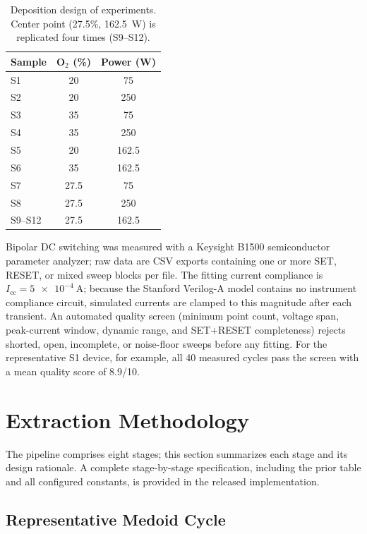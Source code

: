 \documentclass[journal]{IEEEtran}
\begin{document}
\begin{table}[!t]
\centering
\caption{Deposition design of experiments. Center point (27.5\%,
\SI{162.5}{\watt}) is replicated four times (S9--S12).}
\label{tab:doe}
\footnotesize
\begin{tabular}{@{}lcc@{}}
\toprule
Sample & O$_2$ (\%) & Power (W)\\
\midrule
S1 & 20   & 75\\
S2 & 20   & 250\\
S3 & 35   & 75\\
S4 & 35   & 250\\
S5 & 20   & 162.5\\
S6 & 35   & 162.5\\
S7 & 27.5 & 75\\
S8 & 27.5 & 250\\
S9--S12 & 27.5 & 162.5\\
\bottomrule
\end{tabular}
\end{table}

Bipolar DC switching was measured with a Keysight B1500 semiconductor
parameter analyzer; raw data are CSV exports containing one or more SET,
RESET, or mixed sweep blocks per file.  The fitting current compliance is
$I_{\mathrm{cc}}=\SI{5e-4}{\ampere}$; because the Stanford Verilog-A model
contains no instrument compliance circuit, simulated currents are clamped to
this magnitude after each transient.  An automated quality screen (minimum
point count, voltage span, peak-current window, dynamic range, and
SET+RESET completeness) rejects shorted, open, incomplete, or noise-floor
sweeps before any fitting.  For the representative S1 device, for example,
all 40 measured cycles pass the screen with a mean quality score of 8.9/10.

\section{Extraction Methodology}
\label{sec:method}

The pipeline comprises eight stages; this section summarizes each stage and
its design rationale.  A complete stage-by-stage specification, including the
prior table and all configured constants, is provided in the released
implementation.

\subsection{Representative Medoid Cycle}
\label{sec:medoid}
\end{document}
